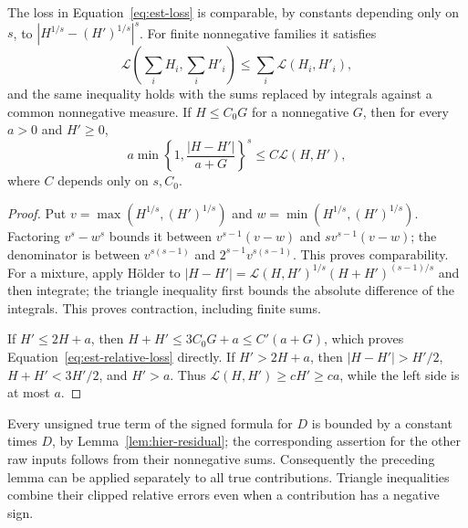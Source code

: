 \begin{lemma}\label{lem:est-loss}
The loss in Equation~\eqref{eq:est-loss} is comparable, by constants
depending only on $s$, to $|H^{1/s}-(H')^{1/s}|^s$.  For finite nonnegative families it satisfies
\[
 \mathcal L\left(\sum_iH_i,\sum_iH'_i\right)
       \le\sum_i\mathcal L(H_i,H'_i),
\]
and the same inequality holds with the sums replaced by integrals
against a common nonnegative measure.  If $H\le C_0G$ for a nonnegative $G$, then
for every $a>0$ and $H'\ge0$,
\begin{equation}
 a\min\left\{1,\frac{|H-H'|}{a+G}\right\}^{s}
       \le C\mathcal L(H,H'),
 \label{eq:est-relative-loss}
\end{equation}
where $C$ depends only on $s,C_0$.
\end{lemma}
\begin{proof}
Put $v=\max(H^{1/s},(H')^{1/s})$ and
$w=\min(H^{1/s},(H')^{1/s})$.  Factoring $v^s-w^s$ bounds it between
$v^{s-1}(v-w)$ and $sv^{s-1}(v-w)$; the denominator is between
$v^{s(s-1)}$ and $2^{s-1}v^{s(s-1)}$.  This proves comparability.
For a mixture, apply H\"older to
$|H-H'|=\mathcal L(H,H')^{1/s}(H+H')^{(s-1)/s}$ and then integrate;
the triangle inequality first bounds the absolute difference of the
integrals.  This proves contraction, including finite sums.

If $H'\le2H+a$, then $H+H'\le3C_0G+a\le C'(a+G)$, which proves
Equation~\eqref{eq:est-relative-loss} directly.  If $H'>2H+a$, then
$|H-H'|>H'/2$, $H+H'<3H'/2$, and $H'>a$.
Thus $\mathcal L(H,H')\ge cH'\ge ca$, while the left side is at most $a$.
\end{proof}

Every unsigned true term of the signed formula for $D$ is bounded by a
constant times $D$, by Lemma~\ref{lem:hier-residual}; the corresponding
assertion for the other raw inputs follows from their nonnegative sums.
Consequently the preceding lemma can be applied separately to all true
contributions.  Triangle inequalities combine their clipped relative
errors even when a contribution has a negative sign.

